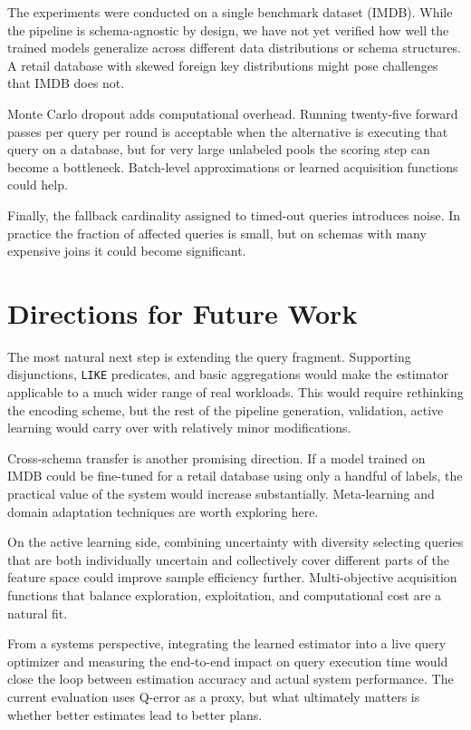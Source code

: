 The experiments were conducted on a single benchmark dataset (IMDB). While the pipeline is schema-agnostic by design, we have not yet verified how well the trained models generalize across different data distributions or schema structures. A retail database with skewed foreign key distributions might pose challenges that IMDB does not.

Monte Carlo dropout adds computational overhead. Running twenty-five forward passes per query per round is acceptable when the alternative is executing that query on a database, but for very large unlabeled pools the scoring step can become a bottleneck. Batch-level approximations or learned acquisition functions could help.

Finally, the fallback cardinality assigned to timed-out queries introduces noise. In practice the fraction of affected queries is small, but on schemas with many expensive joins it could become significant.


\section{Directions for Future Work}

The most natural next step is extending the query fragment. Supporting disjunctions, \texttt{LIKE} predicates, and basic aggregations would make the estimator applicable to a much wider range of real workloads. This would require rethinking the encoding scheme, but the rest of the pipeline generation, validation, active learning would carry over with relatively minor modifications.

Cross-schema transfer is another promising direction. If a model trained on IMDB could be fine-tuned for a retail database using only a handful of labels, the practical value of the system would increase substantially. Meta-learning and domain adaptation techniques are worth exploring here.

On the active learning side, combining uncertainty with diversity selecting queries that are both individually uncertain and collectively cover different parts of the feature space could improve sample efficiency further. Multi-objective acquisition functions that balance exploration, exploitation, and computational cost are a natural fit.

From a systems perspective, integrating the learned estimator into a live query optimizer and measuring the end-to-end impact on query execution time would close the loop between estimation accuracy and actual system performance. The current evaluation uses Q-error as a proxy, but what ultimately matters is whether better estimates lead to better plans.